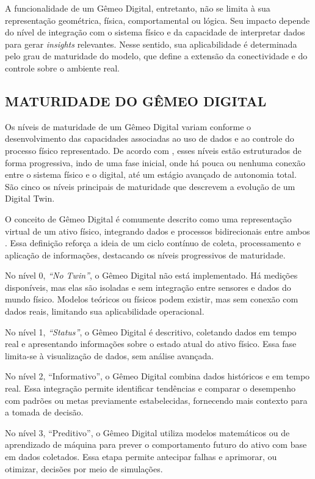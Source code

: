 \documentclass[
    12pt,                %
    openright,           %
    oneside,             %
    a4paper,             %
    english,             %
    spanish,             %
    brazil               %
]{ufscar}
\begin{document}
A funcionalidade de um Gêmeo Digital, entretanto, não se limita à sua representação geométrica, física, comportamental ou lógica. Seu impacto depende do nível de integração com o sistema físico e da capacidade de interpretar dados para gerar \textit{insights} relevantes. Nesse sentido, sua aplicabilidade é determinada pelo grau de maturidade do modelo, que define a extensão da conectividade e do controle sobre o ambiente real.


 \subsection{MATURIDADE DO GÊMEO DIGITAL}

Os níveis de maturidade de um Gêmeo Digital variam conforme o desenvolvimento das capacidades associadas ao uso de dados e ao controle do processo físico representado. De acordo com , esses níveis estão estruturados de forma progressiva, indo de uma fase inicial, onde há pouca ou nenhuma conexão entre o sistema físico e o digital, até um estágio avançado de autonomia total. São cinco os níveis principais de maturidade que descrevem a evolução de um Digital Twin.

O conceito de Gêmeo Digital é comumente descrito como uma representação virtual de um ativo físico, integrando dados e processos bidirecionais entre ambos \cite{JONES202036}. Essa definição reforça a ideia de um ciclo contínuo de coleta, processamento e aplicação de informações, destacando os níveis progressivos de maturidade.

No nível 0, \textit{``No Twin''}, o Gêmeo Digital não está implementado. Há medições disponíveis, mas elas são isoladas e sem integração entre sensores e dados do mundo físico. Modelos teóricos ou físicos podem existir, mas sem conexão com dados reais, limitando sua aplicabilidade operacional.

No nível 1, \textit{``Status''}, o Gêmeo Digital é descritivo, coletando dados em tempo real e apresentando informações sobre o estado atual do ativo físico. Essa fase limita-se à visualização de dados, sem análise avançada.

No nível 2, ``Informativo'', o Gêmeo Digital combina dados históricos e em tempo real. Essa integração permite identificar tendências e comparar o desempenho com padrões ou metas previamente estabelecidas, fornecendo mais contexto para a tomada de decisão.

No nível 3, ``Preditivo'', o Gêmeo Digital utiliza modelos matemáticos ou de aprendizado de máquina para prever o comportamento futuro do ativo com base em dados coletados. Essa etapa permite antecipar falhas e aprimorar, ou otimizar, decisões por meio de simulações.
\end{document}
